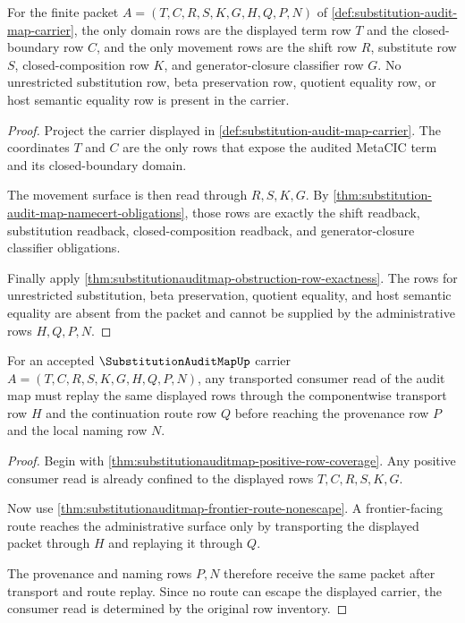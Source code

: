 \begin{theorem}
\label{thm:substitution-audit-map-domain-codomain-exposure}
For the finite packet $A=(T,C,R,S,K,G,H,Q,P,N)$ of \autoref{def:substitution-audit-map-carrier}, the only domain rows are the displayed term row $T$ and the closed-boundary row $C$, and the only movement rows are the shift row $R$, substitute row $S$, closed-composition row $K$, and generator-closure classifier row $G$. No unrestricted substitution row, beta preservation row, quotient equality row, or host semantic equality row is present in the carrier.
\end{theorem}
\begin{proof}
Project the carrier displayed in \autoref{def:substitution-audit-map-carrier}. The coordinates $T$ and $C$ are the only rows that expose the audited MetaCIC term and its closed-boundary domain.

The movement surface is then read through $R,S,K,G$. By \autoref{thm:substitution-audit-map-namecert-obligations}, those rows are exactly the shift readback, substitution readback, closed-composition readback, and generator-closure classifier obligations.

Finally apply \autoref{thm:substitutionauditmap-obstruction-row-exactness}. The rows for unrestricted substitution, beta preservation, quotient equality, and host semantic equality are absent from the packet and cannot be supplied by the administrative rows $H,Q,P,N$.
\end{proof}

\begin{theorem}
\label{thm:substitution-audit-map-replay-determinacy}
For an accepted $\SubstitutionAuditMapUp$ carrier $A=(T,C,R,S,K,G,H,Q,P,N)$, any transported consumer read of the audit map must replay the same displayed rows through the componentwise transport row $H$ and the continuation route row $Q$ before reaching the provenance row $P$ and the local naming row $N$.
\end{theorem}
\begin{proof}
Begin with \autoref{thm:substitutionauditmap-positive-row-coverage}. Any positive consumer read is already confined to the displayed rows $T,C,R,S,K,G$.

Now use \autoref{thm:substitutionauditmap-frontier-route-nonescape}. A frontier-facing route reaches the administrative surface only by transporting the displayed packet through $H$ and replaying it through $Q$.

The provenance and naming rows $P,N$ therefore receive the same packet after transport and route replay. Since no route can escape the displayed carrier, the consumer read is determined by the original row inventory.
\end{proof}

